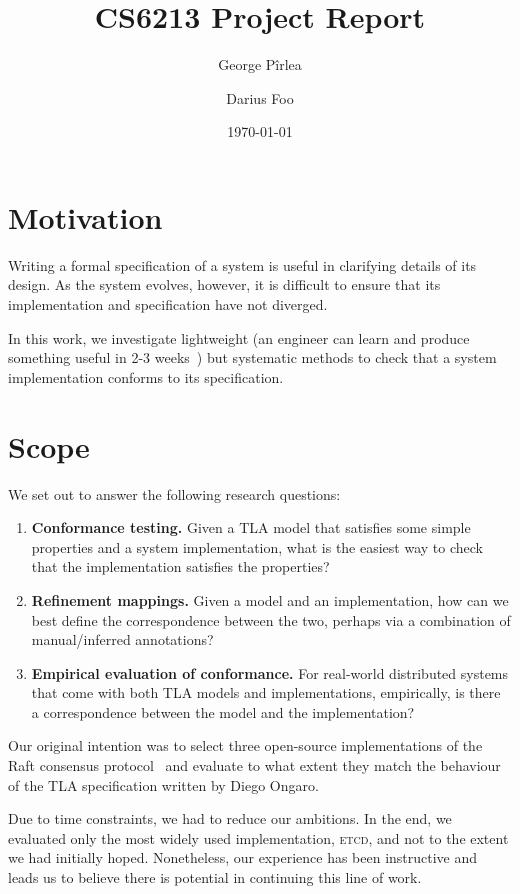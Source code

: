 \documentclass[a4paper]{article}
\title{CS6213 Project Report}
\author{George Pîrlea \and Darius Foo}
\date{\today}
\newcommand{\tname}[1]{\textsc{#1}\xspace}
\newcommand{\etcd}{\tname{etcd}}
\begin{document}
\maketitle

\section{Motivation}

Writing a formal specification of a system is useful in clarifying details of its design.
%
As the system evolves, however, it is difficult to ensure that its implementation and specification have not diverged.

In this work, we investigate lightweight (an engineer can learn and produce something useful in 2-3 weeks~\cite{newcombe_how_2015}) but systematic methods to check that a system implementation conforms to its specification.

\section{Scope}

We set out to answer the following research questions:

\begin{enumerate}[label={(Q\arabic*)}]
    \item \textbf{Conformance testing.} Given a TLA model that satisfies some simple properties and a system implementation, what is the easiest way to check that the implementation satisfies the properties?

    \item \textbf{Refinement mappings.} Given a model and an implementation, how can we best define the correspondence between the two, perhaps via a combination of manual/inferred annotations?

    \item \textbf{Empirical evaluation of conformance.} For real-world distributed systems that come with both TLA models and implementations, empirically, is there a correspondence between the model and the implementation?
\end{enumerate}

Our original intention was to select three open-source implementations of the Raft consensus protocol~\cite{ongaro_search_2014, ongaro_consensus_2014} and evaluate to what extent they match the behaviour of the TLA specification written by Diego Ongaro.

Due to time constraints, we had to reduce our ambitions.
%
In the end, we evaluated only the most widely used implementation, \etcd, and not to the extent we had initially hoped.
%
Nonetheless, our experience has been instructive and leads us to believe there is potential in continuing this line of work.
\end{document}
